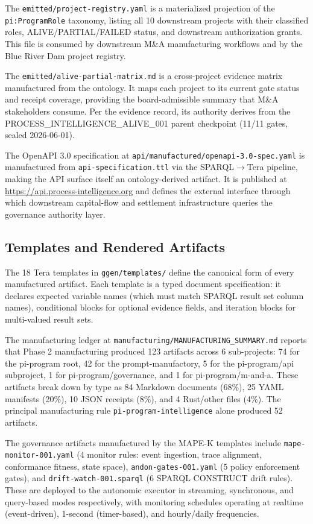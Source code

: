 The \texttt{emitted/project-registry.yaml} is a materialized projection of the \texttt{pi:ProgramRole} taxonomy, listing all 10 downstream projects with their classified roles, ALIVE/PARTIAL/FAILED status, and downstream authorization grants. This file is consumed by downstream M\&A manufacturing workflows and by the Blue River Dam project registry.

The \texttt{emitted/alive-partial-matrix.md} is a cross-project evidence matrix manufactured from the ontology. It maps each project to its current gate status and receipt coverage, providing the board-admissible summary that M\&A stakeholders consume. Per the evidence record, its authority derives from the PROCESS\_INTELLIGENCE\_ALIVE\_001 parent checkpoint (11/11 gates, sealed 2026-06-01).

The OpenAPI 3.0 specification at \texttt{api/manufactured/openapi-3.0-spec.yaml} is manufactured from \texttt{api-specification.ttl} via the SPARQL$\to$Tera pipeline, making the API surface itself an ontology-derived artifact. It is published at \url{https://api.process-intelligence.org} and defines the external interface through which downstream capital-flow and settlement infrastructure queries the governance authority layer.

\subsection{Templates and Rendered Artifacts}
\label{sec:research-pi-program-impl-templates}

The 18 Tera templates in \texttt{ggen/templates/} define the canonical form of every manufactured artifact. Each template is a typed document specification: it declares expected variable names (which must match SPARQL result set column names), conditional blocks for optional evidence fields, and iteration blocks for multi-valued result sets.

The manufacturing ledger at \texttt{manufacturing/MANUFACTURING\_SUMMARY.md} reports that Phase 2 manufacturing produced 123 artifacts across 6 sub-projects: 74 for the pi-program root, 42 for the prompt-manufactory, 5 for the pi-program/api subproject, 1 for pi-program/governance, and 1 for pi-program/m-and-a. These artifacts break down by type as 84 Markdown documents (68\%), 25 YAML manifests (20\%), 10 JSON receipts (8\%), and 4 Rust/other files (4\%). The principal manufacturing rule \texttt{pi-program-intelligence} alone produced 52 artifacts.

The governance artifacts manufactured by the MAPE-K templates include \texttt{mape-monitor-001.yaml} (4 monitor rules: event ingestion, trace alignment, conformance fitness, state space), \texttt{andon-gates-001.yaml} (5 policy enforcement gates), and \texttt{drift-watch-001.sparql} (6 SPARQL CONSTRUCT drift rules). These are deployed to the autonomic executor in streaming, synchronous, and query-based modes respectively, with monitoring schedules operating at realtime (event-driven), 1-second (timer-based), and hourly/daily frequencies.
